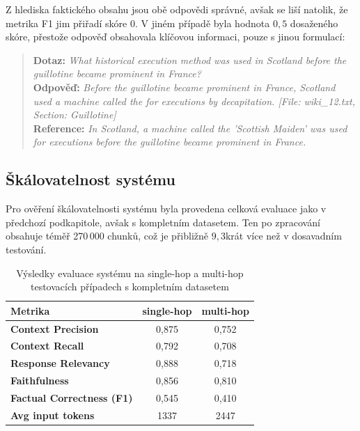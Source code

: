 \noindent Z hlediska faktického obsahu jsou obě odpovědi správné, avšak se liší natolik, že metrika F1 jim přiřadí skóre $0$. V jiném případě byla hodnota $0{,}5$ dosaženého skóre, přestože odpověď obsahovala klíčovou informaci, pouze s jinou formulací:

\begin{quote}
\textbf{Dotaz:} \textit{What historical execution method was used in Scotland before the guillotine became prominent in France?} \\
\textbf{Odpověď:} \textit{Before the guillotine became prominent in France, Scotland used a machine called the  for executions by decapitation. [File: wiki\_12.txt, Section: Guillotine]} \\
\textbf{Reference:} \textit{In Scotland, a machine called the 'Scottish Maiden' was used for executions before the guillotine became prominent in France.} 
\end{quote}


\subsection{Škálovatelnost systému}
Pro ověření škálovatelnosti systému byla provedena celková evaluace jako v předchozí podkapitole, avšak s kompletním datasetem. Ten po zpracování obsahuje téměř 270\,000 chunků, což je přibližně $9{,}3$krát více než v dosavadním testování.

\begin{table}[H]
    \centering
    \renewcommand{\arraystretch}{1.2}
    \begin{tabular}{|l|c|c|}
        \hline
        \textbf{Metrika} & \textbf{single-hop} & \textbf{multi-hop} \\
        \hline
        \textbf{Context Precision}         & 0{,}875 & 0{,}752 \\
        \textbf{Context Recall}            & 0{,}792 & 0{,}708 \\
        \textbf{Response Relevancy}        & 0{,}888 & 0{,}718 \\
        \textbf{Faithfulness}              & 0{,}856 & 0{,}810 \\
        \textbf{Factual Correctness (F1)}  & 0{,}545 & 0{,}410 \\
        \textbf{Avg input tokens}          & 1337 & 2447 \\
        \hline
    \end{tabular}
    \caption{Výsledky evaluace systému na single-hop a multi-hop testovacích případech s kompletním datasetem}
    \label{tab:finalbigeval}
\end{table}

